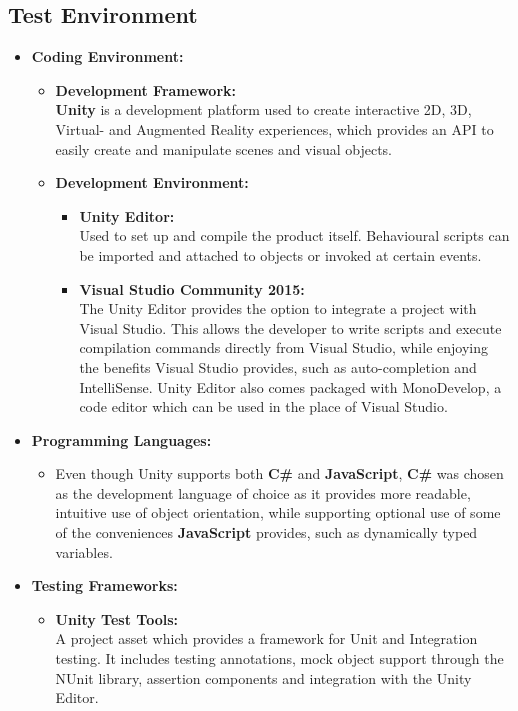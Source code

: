 \documentclass[a4paper,12pt]{article}
\begin{document}
\subsection{Test Environment}
	\begin{itemize}
		\item \textbf{Coding Environment:}
			\begin{itemize}
				\item \textbf{Development Framework:}\\
					\textbf{Unity} is a development platform used to create interactive 2D, 3D, Virtual- and Augmented Reality experiences, which provides an API to easily create and manipulate scenes and visual objects.
				\item \textbf{Development Environment:}
					\begin{itemize}
						\item \textbf{Unity Editor:}\\
						Used to set up and compile the product itself. Behavioural scripts can be imported and attached to objects or invoked at certain events.
						\item \textbf{Visual Studio Community 2015:}\\
						The Unity Editor provides the option to integrate a project with Visual Studio. This allows the developer to write scripts and execute compilation commands directly from Visual Studio, while enjoying the benefits Visual Studio provides, such as auto-completion and IntelliSense. Unity Editor also comes packaged with MonoDevelop, a code editor which can be used in the place of Visual Studio.
					\end{itemize}
			\end{itemize}
		\item \textbf{Programming Languages:}
			\begin{itemize}
				\item Even though Unity supports both \textbf{C\#} and \textbf{JavaScript}, \textbf{C\#} was chosen as the development language of choice as it provides more readable, intuitive use of object orientation, while supporting optional use of some of the conveniences \textbf{JavaScript} provides, such as dynamically typed variables.
			\end{itemize}
		\item \textbf{Testing Frameworks:}
			\begin{itemize}
				\item \textbf{Unity Test Tools:}\\
				A project asset which provides a framework for Unit and Integration testing. It includes testing annotations, mock object support through the NUnit library, assertion components and integration with the Unity Editor. 

\end{itemize}
\end{itemize}
\end{document}
